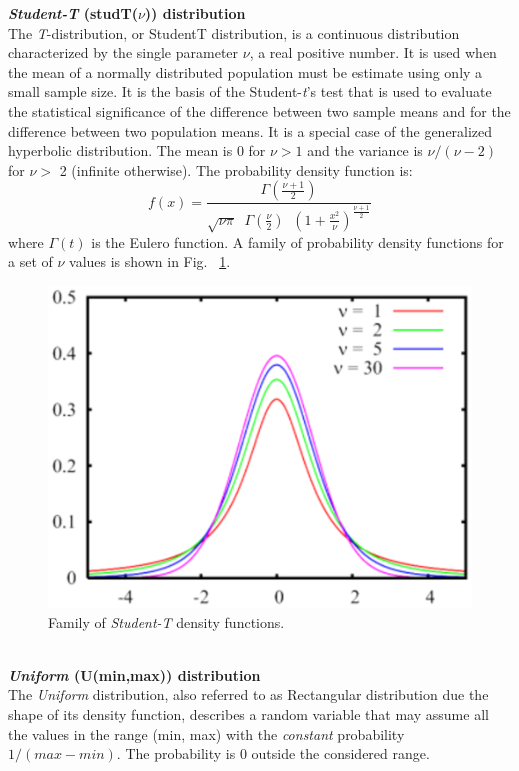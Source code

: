 \textbf{\emph{Student-T} (studT($\nu$)) distribution}\\
The \emph{T}-distribution, or StudentT distribution, is a continuous
distribution characterized by the single parameter $\nu$, a real
positive number. It is used when the mean of a normally
distributed population must be estimate using only a small sample
size. It is the basis of the Student-\emph{t}'s test that is used to
evaluate the statistical significance of the difference between
two sample means and for the difference between two population
means. It is a special case of the generalized hyperbolic
distribution. The mean is 0 for $\nu>1$ and the variance is
$\nu/(\nu-2)$ for $\nu >$ 2 (infinite otherwise). The probability
density function is:
\[ f(x) = \frac{\Gamma(\frac{\nu+1}{2})}{\sqrt{\nu \pi} \;\;
\Gamma(\frac{\nu}{2}) \;\; (1+\frac{x^2}
{\nu})^\frac{\nu+1}{2}}
\]
where $\Gamma(t)$ is the Eulero function. A family of probability
density functions for a set of $\nu$ values is shown in Fig.
~\ref{fig:famStut}.
\begin{figure}[htb]
    \begin{center}
        \includegraphics[scale=.5]{img/jsimg/4.12.eps}
    \end{center}
    \caption{Family of \emph{Student-T} density functions.}
    \label{fig:famStut}
\end{figure}\\

\textbf{\emph{Uniform} (U(min,max)) distribution}\\
The \emph{Uniform} distribution, also referred to as Rectangular
distribution due the shape of its density function, describes a
random variable that may assume all the values in the range (min,
max) with the \emph{constant} probability $1/(max-min)$. The
probability is 0 outside the considered range.

